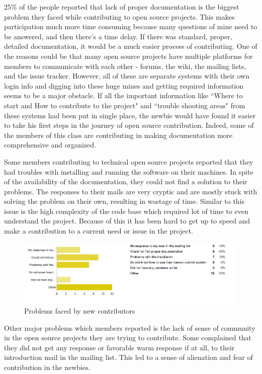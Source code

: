 25\% of the people reported that lack of proper documentation is the biggest problem they faced while contributing to open source projects. This makes participation much more time consuming because many questions of mine need to be answered, and then there's a time delay. If there was standard, proper, detailed documentation, it would be a much easier process of contributing. One of the reasons could be  that many open source projects have multiple platforms for members to communicate with each other - forums, the wiki, the mailing lists, and the issue tracker. However, all of these are separate systems with their own login info and digging into these huge mines and getting required information seems to be a major obstacle. If all the important information like ``Where to start and How to contribute to the project" and ``trouble shooting areas" from these systems had been put in single place, the newbie would have found it easier to take his first steps in the journey of open source contribution. Indeed, some of the members of this class are contributing in making documentation more comprehensive and organized.

Some members contributing to technical open source projects reported that they had troubles with installing and running the software on their machines. In spite of the availability of the documentation, they could not find a solution to their problems. The responses to their mails are very cryptic and are mostly stuck with solving the problem on their own, resulting in wastage of time. Similar to this issue is the high complexity of the code base which required lot of time to even understand the project. Because of this it has been hard to get up to speed and make a contribution to a current need or issue in the project.

\begin{figure}[ht!]
\centering
\includegraphics[width=130mm]{chapters/img/problems_faced.png}
\caption{Problems faced by new contributors}
\label{overflow}
\end{figure}

Other major problems which members reported is the lack of sense of community in the open source projects they are trying to contribute. Some complained that they did not get any response or favorable warm response if at all, to their introduction mail in the mailing list. This led to a sense of alienation and fear of contribution in the newbies. 

